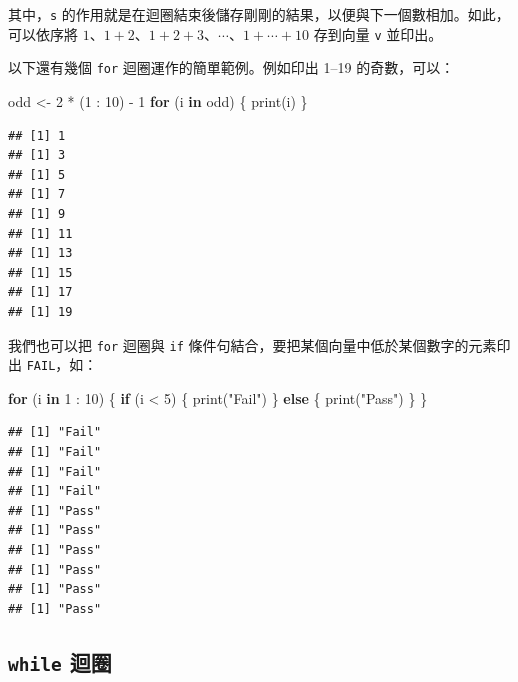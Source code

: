 \documentclass[
]{book}
\newenvironment{Shaded}{\begin{snugshade}}{\end{snugshade}}
\newcommand{\ControlFlowTok}[1]{\textcolor[rgb]{0.13,0.29,0.53}{\textbf{#1}}}
\newcommand{\DecValTok}[1]{\textcolor[rgb]{0.00,0.00,0.81}{#1}}
\newcommand{\FunctionTok}[1]{\textcolor[rgb]{0.00,0.00,0.00}{#1}}
\newcommand{\NormalTok}[1]{#1}
\newcommand{\OtherTok}[1]{\textcolor[rgb]{0.56,0.35,0.01}{#1}}
\newcommand{\SpecialCharTok}[1]{\textcolor[rgb]{0.00,0.00,0.00}{#1}}
\newcommand{\StringTok}[1]{\textcolor[rgb]{0.31,0.60,0.02}{#1}}
\theoremstyle{definition}
\theoremstyle{remark}
\begin{document}
其中，\texttt{s} 的作用就是在迴圈結束後儲存剛剛的結果，以便與下一個數相加。如此，可以依序將 \(1\)、\(1+2\)、\(1+2+3\)、\(\cdots{}\)、\(1+\cdots{}+10\) 存到向量 \texttt{v} 並印出。

以下還有幾個 \texttt{for} 迴圈運作的簡單範例。例如印出 1--19 的奇數，可以：

\begin{Shaded}
\begin{Highlighting}[]
\NormalTok{odd }\OtherTok{\textless{}{-}} \DecValTok{2} \SpecialCharTok{*}\NormalTok{ (}\DecValTok{1} \SpecialCharTok{:} \DecValTok{10}\NormalTok{) }\SpecialCharTok{{-}} \DecValTok{1}
\ControlFlowTok{for}\NormalTok{ (i }\ControlFlowTok{in}\NormalTok{ odd) \{}
  \FunctionTok{print}\NormalTok{(i)}
\NormalTok{\}}
\end{Highlighting}
\end{Shaded}

\begin{verbatim}
## [1] 1
## [1] 3
## [1] 5
## [1] 7
## [1] 9
## [1] 11
## [1] 13
## [1] 15
## [1] 17
## [1] 19
\end{verbatim}

我們也可以把 \texttt{for} 迴圈與 \texttt{if} 條件句結合，要把某個向量中低於某個數字的元素印出 \texttt{FAIL}，如：

\begin{Shaded}
\begin{Highlighting}[]
\ControlFlowTok{for}\NormalTok{ (i }\ControlFlowTok{in} \DecValTok{1} \SpecialCharTok{:} \DecValTok{10}\NormalTok{) \{}
  \ControlFlowTok{if}\NormalTok{ (i }\SpecialCharTok{\textless{}} \DecValTok{5}\NormalTok{) \{}
    \FunctionTok{print}\NormalTok{(}\StringTok{"Fail"}\NormalTok{)}
\NormalTok{  \} }\ControlFlowTok{else}\NormalTok{ \{}
    \FunctionTok{print}\NormalTok{(}\StringTok{"Pass"}\NormalTok{)}
\NormalTok{  \}}
\NormalTok{\}}
\end{Highlighting}
\end{Shaded}

\begin{verbatim}
## [1] "Fail"
## [1] "Fail"
## [1] "Fail"
## [1] "Fail"
## [1] "Pass"
## [1] "Pass"
## [1] "Pass"
## [1] "Pass"
## [1] "Pass"
## [1] "Pass"
\end{verbatim}

\hypertarget{while-ux8ff4ux5708}{%
\subsection{\texorpdfstring{\texttt{while} 迴圈}{while 迴圈}}\label{while-ux8ff4ux5708}}
\end{document}
